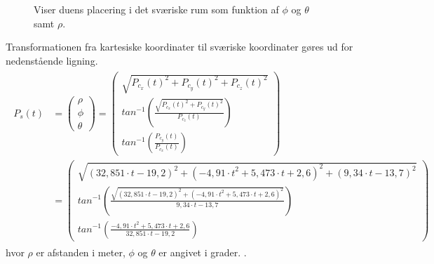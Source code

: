 \begin{figure}[!th]
\centering
\begin{tikzpicture}[scale=4]

\end{tikzpicture}
\caption[Sværisk koordinatsystem til koordinattransformation]{Viser duens placering i det sværiske rum som funktion af  \(\phi\) og \(\theta\) samt \(\rho\).}
\label{fig:thetaphi_degree}
\end{figure}





Transformationen fra kartesiske koordinater til sværiske koordinater gøres ud for nedenstående ligning.
\begin{align}
\begin{split}
{ P }_{ s }\left( t \right) &=\left( \begin{matrix} \rho  \\ \phi  \\ \theta  \end{matrix} \right) =\left( \begin{matrix} \sqrt { { { P }_{ c_x }\left( t \right) }^{ 2 }+{ { P }_{ c_y }\left( t \right) }^{ 2 }+{ { P }_{ c_z }\left( t \right) }^{ 2 } }  \\ { tan }^{ -1 }\left( \frac { \sqrt { { { P }_{ c_x }\left( t \right) }^{ 2 }+{ { P }_{ c_y }\left( t \right) }^{ 2 } }  }{ { P }_{ c_z }\left( t \right) }  \right)  \\ { tan }^{ -1 }\left( \frac { { P }_{ c_y }\left( t \right) }{ { P }_{ c_x }\left( t \right) }  \right)  \end{matrix} \right) 
\\
 &=\left( \begin{matrix} \sqrt { { \left( 32,851\cdot t-19,2 \right)  }^{ 2 }+{ \left( -{ 4,91\cdot t }^{ 2 }+5,473\cdot t+2,6 \right)  }^{ 2 }+{ \left( 9,34\cdot t-13,7 \right)  }^{ 2 } }  \\ { tan }^{ -1 }\left( \frac { \sqrt { { \left( 32,851\cdot t-19,2 \right)  }^{ 2 }+{ \left( -{ 4,91\cdot t }^{ 2 }+5,473\cdot t+2,6 \right)  }^{ 2 } }  }{ 9,34\cdot t-13,7 }  \right)  \\ { tan }^{ -1 }\left( \frac { -{ 4,91\cdot t }^{ 2 }+5,473\cdot t+2,6 }{ 32,851\cdot t-19,2 }  \right)  \end{matrix} \right) 
\label{eq:sv_koordi}
\end{split}
\end{align}
hvor \(\rho\) er afstanden i meter, \(\phi\) og \(\theta\) er angivet i grader. \citep[Kap. 10.6, s. 598]{adam}.
